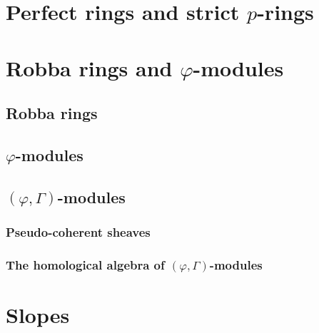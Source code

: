 \section{Perfect rings and strict \texorpdfstring{$p$}{}-rings}

\section{Robba rings and \texorpdfstring{$\varphi$}{}-modules}
    \subsection{Robba rings}
    
    \subsection{\texorpdfstring{$\varphi$}{}-modules}

    \subsection{\texorpdfstring{$(\varphi, \Gamma)$}{}-modules}
        \subsubsection{Pseudo-coherent sheaves}
        
        \subsubsection{The homological algebra of \texorpdfstring{$(\varphi, \Gamma)$}{}-modules}
        
\section{Slopes}
